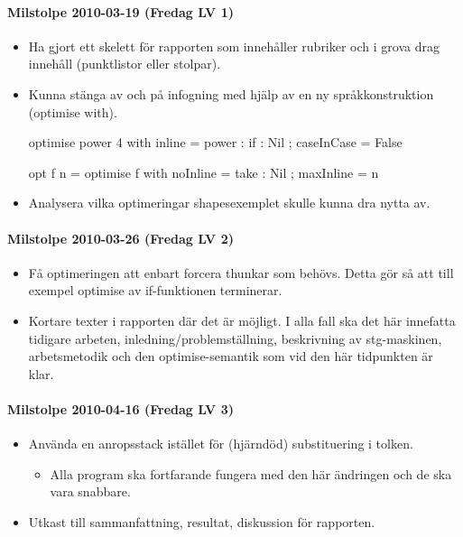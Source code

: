 \documentclass[../Appendix]{subfiles}
\begin{document}
\paragraph{Milstolpe 2010-03-19 (Fredag LV 1)}
\begin{itemize}
\item Ha gjort ett skelett för rapporten som innehåller rubriker och i grova
drag innehåll (punktlistor eller stolpar).
\item Kunna stänga av och på infogning med hjälp av en ny språkkonstruktion
(optimise with).


\begin{codeEx}
optimise power 4 with 
	{ inline     = power : if : Nil 
	; caseInCase = False
	}

opt f n = optimise f with 
	{ noInline  = take : Nil
	; maxInline = n
	}
\end{codeEx}

\item Analysera vilka optimeringar shapesexemplet skulle kunna dra nytta
av.
\end{itemize}

\paragraph{Milstolpe 2010-03-26 (Fredag LV 2)}
\begin{itemize}
\item Få optimeringen att enbart forcera thunkar som behövs. Detta gör så
att till exempel optimise av if-funktionen terminerar.
\item Kortare texter i rapporten där det är möjligt. I alla fall ska det
här innefatta tidigare arbeten, inledning/problemställning, beskrivning
av stg-maskinen, arbetsmetodik och den optimise-semantik som vid den
här tidpunkten är klar.
\end{itemize}

\paragraph{Milstolpe 2010-04-16 (Fredag LV 3)}
\begin{itemize}
\item Använda en anropsstack istället för (hjärndöd) substituering i tolken.

\begin{itemize}
\item Alla program ska fortfarande fungera med den här ändringen och de
ska vara snabbare.
\end{itemize}
\item Utkast till sammanfattning, resultat, diskussion för rapporten.
\end{itemize}
\end{document}
